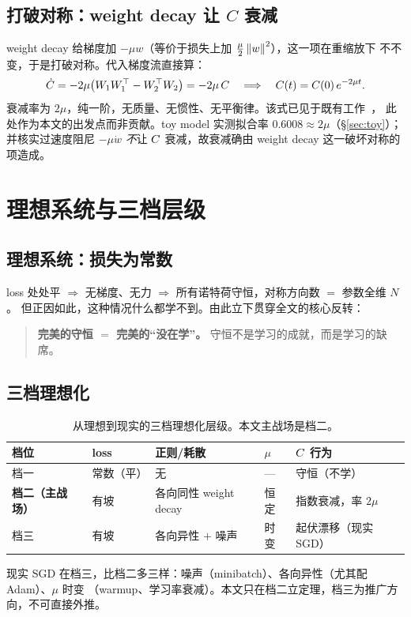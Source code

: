 \documentclass[11pt]{article}
\begin{document}
\subsection{打破对称：weight decay 让 \texorpdfstring{$C$}{C} 衰减}\label{sec:setup:break}
weight decay 给梯度加 $-\mu w$（等价于损失上加 $\tfrac{\mu}{2}\left\lVert w \right\rVert^2$），这一项在重缩放下
不不变，于是打破对称。代入梯度流直接算：
\begin{equation}\label{eq:Cdecay}
  \dot{C} = -2\mu\big(W_1W_1^\top - W_2^\top W_2\big) = -2\mu\,C
  \quad\Longrightarrow\quad C(t)=C(0)\,e^{-2\mu t}.
\end{equation}
衰减率为 $2\mu$，纯一阶，无质量、无惯性、无平衡律。该式已见于既有工作~\citep{kunin2021neural}，
此处作为本文的出发点而非贡献。toy model 实测拟合率 $0.6008\approx 2\mu$（\S\ref{sec:toy}）；
并核实过速度阻尼 $-\mu\dot w$ \emph{不}让 $C$ 衰减，故衰减确由 weight decay 这一破坏对称的项造成。

\section{理想系统与三档层级}\label{sec:ladder}

\subsection{理想系统：损失为常数}\label{sec:ladder:flat}
loss 处处平 $\Rightarrow$ 无梯度、无力 $\Rightarrow$ 所有诺特荷守恒，对称方向数 $=$ 参数全维 $N$。
但正因如此，这种情况什么都学不到。由此立下贯穿全文的核心反转：
\begin{quote}
\textbf{完美的守恒 $=$ 完美的“没在学”。} 守恒不是学习的成就，而是学习的缺席。
\end{quote}

\subsection{三档理想化}\label{sec:ladder:three}
\begin{table}[h]
\centering
\caption{从理想到现实的三档理想化层级。本文主战场是档二。}
\label{tab:three-stages}
\begin{tabular}{lllll}
\toprule
\textbf{档位} & \textbf{loss} & \textbf{正则/耗散} & \textbf{$\mu$} & \textbf{$C$ 行为} \\
\midrule
档一 & 常数（平） & 无 & --- & 守恒（不学） \\
\textbf{档二（主战场）} & 有坡 & 各向同性 weight decay & 恒定 & 指数衰减，率 $2\mu$ \\
档三 & 有坡 & 各向异性 $+$ 噪声 & 时变 & 起伏漂移（现实 SGD） \\
\bottomrule
\end{tabular}
\end{table}
现实 SGD 在档三，比档二多三样：噪声（minibatch）、各向异性（尤其配 Adam）、$\mu$ 时变
（warmup、学习率衰减）。本文只在档二立定理，档三为推广方向，不可直接外推。
\end{document}
